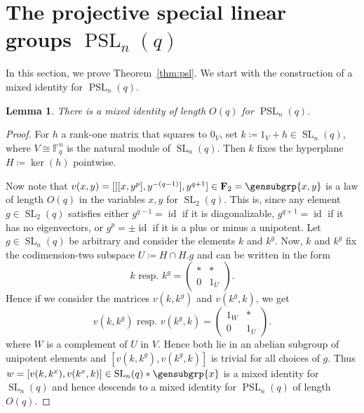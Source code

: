 \documentclass[a4paper,11pt]{amsproc}
\newcommand{\finfield}{\mathbb{F}}%
\newcommand{\trivgrp}{\mathbf{1}}%
\newcommand{\freegrp}{\mathbf F}%
\DeclareMathOperator{\SL}{SL}%
\DeclareMathOperator{\PSL}{PSL}%
\DeclareMathOperator{\id}{id}%
\theoremstyle{plain}
\newtheorem{lemma}{Lemma}[section]
\theoremstyle{definition}
\newtheorem{remark}[lemma]{Remark}
\begin{document}
	
	
	\section{The projective special linear groups \texorpdfstring{$\PSL_n(q)$}{PSLn}}
	
	In this section, we prove Theorem~\ref{thm:psl}. We start with the construction of a mixed identity for $\PSL_n(q)$.
	
	\begin{lemma}\label{lem:psl_up_bd}
		There is a mixed identity of length $O(q)$ for $\PSL_n(q)$.
	\end{lemma}
	\begin{proof}
		
		For $h$ a rank-one matrix that squares to $0_V$, set $k\coloneqq 1_V+h\in\SL_n(q)$, where $V\cong\finfield_q^n$ is the natural module of $\SL_n(q)$. Then $k$ fixes the hyperplane $H\coloneqq\ker(h)$ pointwise. 
		
		Now note that $v(x,y)=[[[x,y^p],y^{-(q-1)}],y^{q+1}]\in\freegrp_2=\gensubgrp{x,y}$ is a law of length $O(q)$ in the variables $x,y$ for $\SL_2(q)$. This is, since any element $g\in\SL_2(q)$ satisfies either $g^{q-1}=\id$ if it is diagonalizable, $g^{q+1}=\id$ if it has no eigenvectors, or $g^p=\pm\id$ if it is a plus or minus a unipotent.  Let $g\in\SL_n(q)$ be arbitrary and consider the elements $k$ and $k^g$. Now, $k$ and $k^g$ fix the codimension-two subspace $U\coloneqq H\cap H.g$ and can be written in the form
		$$
		k\text{ resp. } k^g=
		\begin{pmatrix}
			\ast & \ast\\
			0 & 1_U
		\end{pmatrix}.
		$$
		Hence if we consider the matrices $v(k,k^g)$ and $v(k^g,k)$, we get
		$$
		v(k,k^g)  \text{ resp. } v(k^g,k)=\begin{pmatrix}
			1_W & \ast\\
			0 & 1_U
		\end{pmatrix}.
		$$
		where $W$ is a complement of $U$ in $V$. Hence both lie in an abelian subgroup of unipotent elements and $[v(k,k^g),v(k^g,k)]$ is trivial for all choices of $g$. Thus $w=[v(k,k^x),v(k^x,k)]\in\SL_n(q)\ast\gensubgrp{x}$ is a mixed identity for $\SL_n(q)$ and hence descends to a mixed identity for $\PSL_n(q)$ of length $O(q)$\label{result:bd_ids_psl_nq}.
	\end{proof}
	
\end{document}
